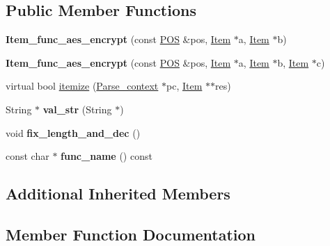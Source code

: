 \subsection*{Public Member Functions}
\begin{DoxyCompactItemize}
\item 
\mbox{\label{classItem__func__aes__encrypt_a75a5dd1854c89d24901262bd23dca960}} 
{\bfseries Item\+\_\+func\+\_\+aes\+\_\+encrypt} (const \mbox{\hyperlink{structYYLTYPE}{P\+OS}} \&pos, \mbox{\hyperlink{classItem}{Item}} $\ast$a, \mbox{\hyperlink{classItem}{Item}} $\ast$b)
\item 
\mbox{\label{classItem__func__aes__encrypt_a60b18a3e420b845b9925b9a6449ef213}} 
{\bfseries Item\+\_\+func\+\_\+aes\+\_\+encrypt} (const \mbox{\hyperlink{structYYLTYPE}{P\+OS}} \&pos, \mbox{\hyperlink{classItem}{Item}} $\ast$a, \mbox{\hyperlink{classItem}{Item}} $\ast$b, \mbox{\hyperlink{classItem}{Item}} $\ast$c)
\item 
virtual bool \mbox{\hyperlink{classItem__func__aes__encrypt_a3dea8d64bcdabb7dabe2f2e76959408c}{itemize}} (\mbox{\hyperlink{structParse__context}{Parse\+\_\+context}} $\ast$pc, \mbox{\hyperlink{classItem}{Item}} $\ast$$\ast$res)
\item 
\mbox{\label{classItem__func__aes__encrypt_a0547addf6c7ca1525e8572ce24561bb5}} 
String $\ast$ {\bfseries val\+\_\+str} (String $\ast$)
\item 
\mbox{\label{classItem__func__aes__encrypt_a7b0c89093fdb9b990cd80551cccc841d}} 
void {\bfseries fix\+\_\+length\+\_\+and\+\_\+dec} ()
\item 
\mbox{\label{classItem__func__aes__encrypt_aa727ff6a6d89b5040d69acc253784db5}} 
const char $\ast$ {\bfseries func\+\_\+name} () const
\end{DoxyCompactItemize}
\subsection*{Additional Inherited Members}


\subsection{Member Function Documentation}
\mbox{\label{classItem__func__aes__encrypt_a3dea8d64bcdabb7dabe2f2e76959408c}} 
